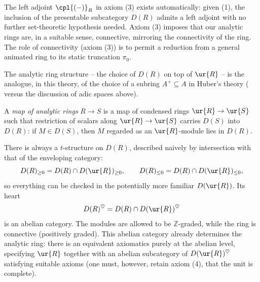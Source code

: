 \begin{remark}
\label{rmk:1:left-adjoint-automatic}
The left adjoint $\cpl{(-)}_R$ in axiom (3) exists automatically: given (1), the
inclusion of the presentable subcategory $D(R)$ admits a left adjoint with no
further set-theoretic hypothesis needed. Axiom (3) imposes that our analytic rings
are, in a suitable sense, connective, mirroring the connectivity of the ring.
The role of connectivity (axiom (3)) is to permit a reduction from a general
animated ring to its static truncation $\pi_0$.
\end{remark}

\begin{remark}[$A^{+}$, revisited]
\label{rmk:1:analytic-analog-of-Aplus}
The analytic ring structure -- the choice of $D(R)$ on top of $\ur{R}$ -- is
the analogue, in this theory, of the choice of a subring $A^{+}\subseteq A$ in
Huber's theory ( versus the discussion of adic spaces
above).
\end{remark}

\begin{definition}
\label{def:1:map-analytic-rings}
A \emph{map of analytic rings} $R\to S$ is a map of condensed rings
$\ur{R}\to\ur{S}$ such that restriction of scalars along $\ur{R}\to\ur{S}$
carries $D(S)$ into $D(R)$: if $M\in D(S)$, then $M$ regarded as an
$\ur{R}$-module lies in $D(R)$.
\end{definition}

\begin{remark}
\label{rmk:1:t-structure}
There is always a $t$-structure on $D(R)$, described naively by intersection with
that of the enveloping category:
\begin{equation*}
D(R)_{\geq 0}=D(R)\cap D(\ur{R})_{\geq 0},\qquad
D(R)_{\leq 0}=D(R)\cap D(\ur{R})_{\leq 0},
\end{equation*}
so everything can be checked in the potentially more familiar $D(\ur{R})$. Its
heart
\[
D(R)^{\heartsuit}=D(R)\cap D(\ur{R})^{\heartsuit}
\]
is an abelian category. The modules are allowed to be $\mathbb{Z}$-graded, while
the ring is connective (positively graded). This abelian category already
determines the analytic ring: there is an equivalent axiomatics purely at the
abelian level, specifying $\ur{R}$ together with an abelian subcategory of
$D(\ur{R})^{\heartsuit}$ satisfying suitable axioms (one must, however, retain
axiom (4), that the unit is complete).
\end{remark}

